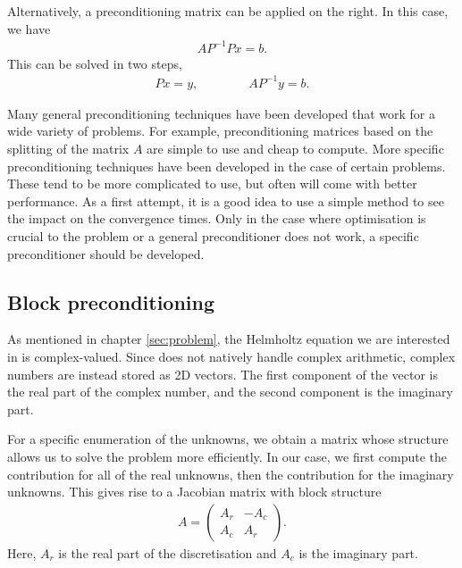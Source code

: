 Alternatively, a preconditioning matrix can be applied on the right.
In this case, we have
\begin{align}
	A P^{-1} P x = b. \label{eqn:precond_right}
\end{align}
This can be solved in two steps, 
\begin{align}
	P x = y, \qquad \qquad A P^{-1} y = b.
\end{align}


Many general preconditioning techniques have been developed that work for a wide variety of problems.
For example, preconditioning matrices based on the splitting of the matrix $A$ are simple to use and cheap to compute.
More specific preconditioning techniques have been developed in the case of certain problems.
These tend to be more complicated to use, but often will come with better performance.
As a first attempt, it is a good idea to use a simple method to see the impact on the convergence times.
Only in the case where optimisation is crucial to the problem or a general preconditioner does not work, a specific preconditioner should be developed.



\subsection{Block preconditioning}


As mentioned in chapter \ref{sec:problem}, the Helmholtz equation we are interested in is complex-valued.
Since \oomph does not natively handle complex arithmetic, complex numbers are instead stored as 2D vectors.
The first component of the vector is the real part of the complex number, and the second component is the imaginary part.

For a specific enumeration of the unknowns, we obtain a matrix whose structure allows us to solve the problem more efficiently.
In our case, we first compute the contribution for all of the real unknowns, then the contribution for the imaginary unknowns.
This gives rise to a Jacobian matrix with block structure
\begin{align}
	A = \begin{pmatrix}
		A_r & -A_c \\ A_c & A_r
	\end{pmatrix}.
\end{align}
Here, $A_r$ is the real part of the discretisation and $A_c$ is the imaginary part.

